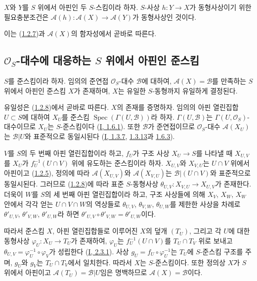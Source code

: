 \begin{env}[1.2.8]
\label{II.1.2.8-ko}
$X$와 $Y$를 $S$ 위에서 아핀인 두 $S$-스킴이라 하자. $S$-사상
$h:Y\to X$가 동형사상이기 위한 필요충분조건은
$\mathcal{A}(h):\mathcal{A}(X)\to\mathcal{A}(Y)$가 동형사상인 것이다.
\end{env}

이는 (\hyperref[II.1.2.7-ko]{1.2.7})과 $\mathcal{A}(X)$의 함자성에서
곧바로 따른다.

\subsection{$\mathcal{O}_S$-대수에 대응하는 $S$ 위에서 아핀인 준스킴}
\label{subsection:II.1.3-ko}

\begin{env}[1.3.1]
\label{II.1.3.1-ko}
$S$를 준스킴이라 하자. 임의의 준연접 $\mathcal{O}_S$-대수
$\mathcal{B}$에 대하여, $\mathcal{A}(X)=\mathcal{B}$를 만족하는
$S$ 위에서 아핀인 준스킴 $X$가 존재하며, $X$는 유일한
$S$-동형까지 유일하게 결정된다.
\end{env}

유일성은 (\hyperref[II.1.2.8-ko]{1.2.8})에서 곧바로 따른다.
$X$의 존재를 증명하자. 임의의 아핀 열린집합 $U\subset S$에 대하여
$X_U$를 준스킴
$\operatorname{Spec}(\Gamma(U,\mathcal{B}))$라 하자.
$\Gamma(U,\mathcal{B})$는 $\Gamma(U,\mathcal{O}_S)$-대수이므로
$X_U$는 $S$-준스킴이다
(\hyperref[I.1.6.1-ko]{I, 1.6.1}). 또한 $\mathcal{B}$가
준연접이므로 $\mathcal{O}_S$-대수 $\mathcal{A}(X_U)$는
$\mathcal{B}|U$와 표준적으로 동일시된다
(\hyperref[I.1.3.7-ko]{I, 1.3.7},
\hyperref[I.1.3.13-ko]{1.3.13}과
\hyperref[I.1.6.3-ko]{1.6.3}).

$V$를 $S$의 두 번째 아핀 열린집합이라 하고, $f_U$가 구조 사상
$X_U\to S$를 나타낼 때 $X_{U,V}$를 $X_U$가
$f_U^{-1}(U\cap V)$ 위에 유도하는 준스킴이라 하자.
$X_{U,V}$와 $X_{V,U}$는 $U\cap V$ 위에서 아핀이고
(\hyperref[II.1.2.5-ko]{1.2.5}), 정의에 따라
$\mathcal{A}(X_{U,V})$와 $\mathcal{A}(X_{V,U})$는
$\mathcal{B}|(U\cap V)$와 표준적으로 동일시된다. 그러므로
(\hyperref[II.1.2.8-ko]{1.2.8})에 따라 표준 $S$-동형사상
$\theta_{U,V}:X_{V,U}\to X_{U,V}$가 존재한다. 더욱이 $W$를
$S$의 세 번째 아핀 열린집합이라 하고, 구조 사상들에 의해
$X_V$, $X_W$, $X_W$ 안에서 각각 얻는 $U\cap V\cap W$의
역상들로 $\theta_{U,V}$, $\theta_{V,W}$, $\theta_{U,W}$를
제한한 사상을 차례로 $\theta'_{U,V}$, $\theta'_{V,W}$,
$\theta'_{U,W}$라 하면
$\theta'_{U,V}\circ\theta'_{V,W}=\theta'_{U,W}$이다.

따라서 준스킴 $X$, 아핀 열린집합들로 이루어진 $X$의 덮개
$(T_U)$, 그리고 각 $U$에 대한 동형사상
$\varphi_U:X_U\to T_U$가 존재하여, $\varphi_U$는
$f_U^{-1}(U\cap V)$를 $T_U\cap T_V$ 위로 보내고
$\theta_{U,V}=\varphi_U^{-1}\circ\varphi_V$가 성립한다
(\hyperref[I.2.3.1-ko]{I, 2.3.1}). 사상
$g_U=f_U\circ\varphi_U^{-1}$는 $T_U$에 $S$-준스킴 구조를 주며,
$g_U$와 $g_V$는 $T_U\cap T_V$에서 일치한다. 따라서 $X$는
$S$-준스킴이다. 또한 정의상 $X$가 $S$ 위에서 아핀이고
$\mathcal{A}(T_U)=\mathcal{B}|U$임은 명백하므로
$\mathcal{A}(X)=\mathcal{B}$이다.

